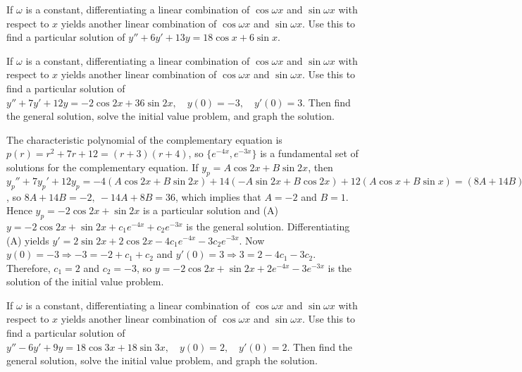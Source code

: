 \documentclass{ximera}
\begin{document}
 \begin{problem}\label{exer:5.3.27}
 If $\omega$ is a constant,  differentiating a linear
combination of $\cos\omega x$ and $\sin\omega x$ with respect to $x$
yields another linear combination of $\cos\omega x$ and $\sin\omega
x$. Use this to find a
particular solution of $y''+6y'+13y=18\cos x+6\sin x$.
\end{problem}

\begin{problem}\label{exer:5.3.28} If $\omega$ is a constant,  differentiating a linear
combination of $\cos\omega x$ and $\sin\omega x$ with respect to $x$
yields another linear combination of $\cos\omega x$ and $\sin\omega
x$. Use this to find a
particular solution of $y''+7y'+12y=-2\cos2x+36\sin2x, \quad  y(0)=-3,\quad y'(0)=3$. Then find the general
solution, solve the initial value problem,
and graph the solution.
\begin{solution}
The characteristic polynomial of the complementary equation is
$p(r)=r^2+7r+12=(r+3)(r+4)$, so $\{e^{-4x},e^{-3x}\}$ is a fundamental
set of solutions for the complementary equation. If
$y_p=A\cos2x+B\sin2x$, then
$y_p''+7y_p'+12y_p=-4(A\cos2x+B\sin2x)+14(-A\sin2x+B\cos2x)+ 12(A\cos
x+B\sin x)=(8A+14B)\cos2x+(8B-14a)\sin2x$, so $8A+14B=-2,\
-14A+8B=36$, which implies that $A=-2$ and $B=1$. Hence
$y_p=-2\cos2x+\sin2x$ is a particular solution and (A)
$y=-2\cos2x+\sin2x+c_1e^{-4x}+c_2e^{-3x}$ is the general solution.
Differentiating (A) yields
$y'=2\sin2x+2\cos2x-4c_1e^{-4x}-3c_2e^{-3x}$. Now $y(0)=-3 \Rightarrow
-3=-2+c_1+c_2$ and $y'(0)=3\Rightarrow 3=2-4c_1-3c_2$. Therefore,
$c_1=2$ and $c_2=-3$, so $y=-2\cos2x+\sin2x+2e^{-4x}-3e^{-3x}$ is the
solution of the initial value problem.
\end{solution}
\end{problem}
 

\begin{problem}\label{exer:5.3.29} 
If $\omega$ is a constant,  differentiating a linear
combination of $\cos\omega x$ and $\sin\omega x$ with respect to $x$
yields another linear combination of $\cos\omega x$ and $\sin\omega
x$. Use this to find a
particular solution of $y''-6y'+9y=18\cos3x+18\sin3x, \quad  y(0)=2,\quad y'(0)=2$. Then find the general
solution, solve the initial value problem,
and graph the solution.
\end{problem}
\end{document}
